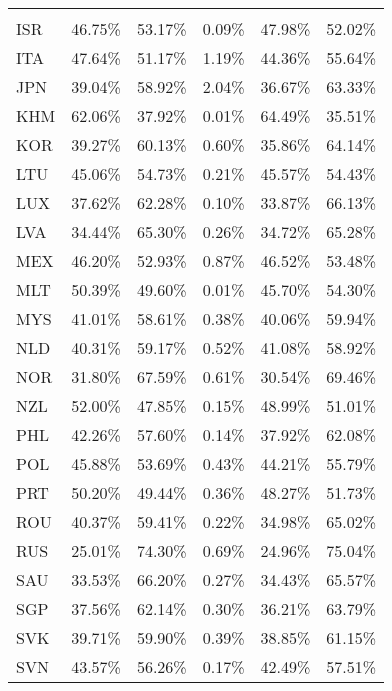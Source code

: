 \documentclass[a4paper,11pt]{article}
\begin{document}
\begin{table}[h]\small
  \centering
    \begin{tabular}{lrrrrr}
        \phantom{ISO3} & \phantom{dva\_fin} & \phantom{dva\_inter} & \phantom{rdv} & \phantom{fva\_fin} & \phantom{fva\_inter} \\
    ISR   & 46.75\% & 53.17\% & 0.09\% & 47.98\% & 52.02\% \\
    ITA   & 47.64\% & 51.17\% & 1.19\% & 44.36\% & 55.64\% \\
    JPN   & 39.04\% & 58.92\% & 2.04\% & 36.67\% & 63.33\% \\
    KHM   & 62.06\% & 37.92\% & 0.01\% & 64.49\% & 35.51\% \\
    KOR   & 39.27\% & 60.13\% & 0.60\% & 35.86\% & 64.14\% \\
    LTU   & 45.06\% & 54.73\% & 0.21\% & 45.57\% & 54.43\% \\
    LUX   & 37.62\% & 62.28\% & 0.10\% & 33.87\% & 66.13\% \\
    LVA   & 34.44\% & 65.30\% & 0.26\% & 34.72\% & 65.28\% \\
    MEX   & 46.20\% & 52.93\% & 0.87\% & 46.52\% & 53.48\% \\
    MLT   & 50.39\% & 49.60\% & 0.01\% & 45.70\% & 54.30\% \\
    MYS   & 41.01\% & 58.61\% & 0.38\% & 40.06\% & 59.94\% \\
    NLD   & 40.31\% & 59.17\% & 0.52\% & 41.08\% & 58.92\% \\
    NOR   & 31.80\% & 67.59\% & 0.61\% & 30.54\% & 69.46\% \\
    NZL   & 52.00\% & 47.85\% & 0.15\% & 48.99\% & 51.01\% \\
    PHL   & 42.26\% & 57.60\% & 0.14\% & 37.92\% & 62.08\% \\
    POL   & 45.88\% & 53.69\% & 0.43\% & 44.21\% & 55.79\% \\
    PRT   & 50.20\% & 49.44\% & 0.36\% & 48.27\% & 51.73\% \\
    ROU   & 40.37\% & 59.41\% & 0.22\% & 34.98\% & 65.02\% \\
    RUS   & 25.01\% & 74.30\% & 0.69\% & 24.96\% & 75.04\% \\
    SAU   & 33.53\% & 66.20\% & 0.27\% & 34.43\% & 65.57\% \\
    SGP   & 37.56\% & 62.14\% & 0.30\% & 36.21\% & 63.79\% \\
    SVK   & 39.71\% & 59.90\% & 0.39\% & 38.85\% & 61.15\% \\
    SVN   & 43.57\% & 56.26\% & 0.17\% & 42.49\% & 57.51\% \\

\end{tabular}
\end{table}
\end{document}
